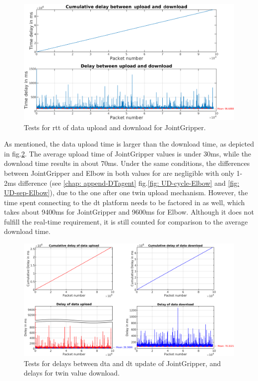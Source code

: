 \begin{figure}[htb]
    \centering
    \includegraphics[width=\textwidth]{figures/tests/DT/Delay_UploadDownloadCycleTime_JointGripper.pdf}
    \caption{Tests for \gls{rtt} of data upload and download for JointGripper. \label{fig: UD-cycle-JointGripper}}
\end{figure}

As mentioned, the data upload time is larger than the download time, as depicted in 
fig.\ref{fig: UD-sep-JointGripper}. The average upload time of JointGripper values is under 30ms, 
while the download time results in about 70ms. Under the same conditions, the differences 
between JointGripper and Elbow in both values for are negligible with only 1-2ms difference (see \ref{chap: append-DTagent} fig.\ref{fig: UD-cycle-Elbow} 
and \ref{fig: UD-sep-Elbow}), due to the one after one twin upload mechanism. However, 
the time spent connecting to the \gls{dt} platform needs to be factored in 
as well, which takes about 9400ms for JointGripper and 9600ms for Elbow. Although it 
does not fulfill the real-time requirement, it is still counted for comparison 
to the average download time.




\begin{figure}[htb]
    \centering
    \includegraphics[width=\textwidth]{figures/tests/DT/Delay_UploadDownload_JointGripper.png}
    \caption{Tests for delays between \gls{dta} and \gls{dt} update of JointGripper, 
    and delays for twin value download. \label{fig: UD-sep-JointGripper}}
\end{figure}



